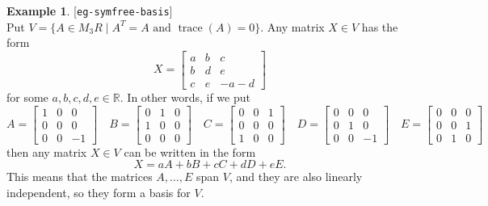 \documentclass{amsart}
\newcommand{\lbl}[1]{\label{#1}\textup{[\texttt{#1}]}\ \\}
\newcommand{\lbl}{\label}
\newcommand{\R}         {{\mathbb{R}}}
\newcommand{\trc}       {\operatorname{trace}}
\newcommand{\bsm}       {\left[\begin{smallmatrix}}
\newcommand{\esm}       {\end{smallmatrix}\right]}
\newcommand{\st}        {\;|\;}
\renewcommand{\:}       {\colon}
\theoremstyle{definition}
\newtheorem{example}[theorem]{Example}
\begin{document}
\begin{example}\lbl{eg-symfree-basis}
 Put $V=\{A\in M_3R\st A^T=A \text{ and } \trc(A)=0\}$.
 Any matrix $X\in V$ has the form
 \[ X = \bsm a & b & c \\
             b & d & e \\
             c & e & -a-d \esm 
 \]
 for some $a,b,c,d,e \in\R$.  In other words, if we put 
 \[ A = \bsm 1&0&0 \\ 0&0&0 \\ 0&0&-1 \esm \hspace{1em} 
    B = \bsm 0&1&0 \\ 1&0&0 \\ 0&0&0  \esm \hspace{1em} 
    C = \bsm 0&0&1 \\ 0&0&0 \\ 1&0&0  \esm \hspace{1em} 
    D = \bsm 0&0&0 \\ 0&1&0 \\ 0&0&-1 \esm \hspace{1em} 
    E = \bsm 0&0&0 \\ 0&0&1 \\ 0&1&0  \esm \hspace{1em} 
 \]
 then any matrix $X\in V$ can be written in the form 
 \[ X = aA + bB + cC + dD + eE. \]
 This means that the matrices $A,\dotsc,E$ span $V$, and
 they are also linearly independent, so they form a basis
 for $V$.
\end{example}
\end{document}
